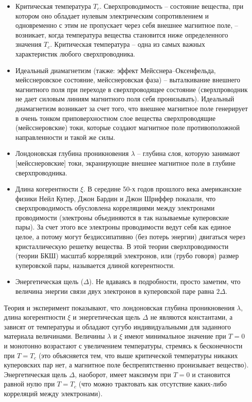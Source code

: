 \begin{itemize}
    \item Критическая температура \( T_c \). Сверхпроводимость -- состояние 
        вещества, при котором оно обладает нулевым электрическим 
        сопротивлением и одновременно с этим не пропускает через себя внешнее 
        магнитное поле, -- возникает, когда температура вещества становится 
        ниже определенного значения \( T_c \). Критическая температура -- одна 
        из самых важных характеристик любого сверхпроводника.
    \item Идеальный диамагнетизм (также: эффект Мейсснера–Оксенфельда, 
        мейсснеровское состояние, мейсснеровская фаза) -- выталкивание 
        внешнего магнитного поля при переходе в сверхпроводящее состояние 
        (сверхпроводник не дает силовым линиям магнитного поля себя 
        пронизывать). Идеальный диамагнетизм возникает за счет того, что 
        внешнее магнитное поле генерирует в очень тонком приповерхностном 
        слое вещества сверхпроводящие (мейсснеровские) токи, которые создают 
        магнитное поле противоположной направленности и такой же силы.
    \item Лондоновская глубина проникновения \( \lambda \) -- глубина слоя, 
        которую занимают [мейсснеровские] токи, экранирующие внешнее магнитное 
        поле в глубине сверхпроводника.
    \item Длина когерентности \( \xi \). В середине 50-х годов прошлого века 
        американские физики Нейл Купер, Джон Бардин и Джон Шриффер показали, 
        что сверхпроводимость обусловлена корреляциями между электронами 
        проводимости (электроны объединяются в так называемые куперовские 
        пары). За счет этого все электроны проводимости ведут себя как единое 
        целое, а потому могут бездиссипативно (без потерь энергии) двигаться 
        через кристаллическую решетку вещества. В этой теории 
        сверхпроводимости (теории БКШ) масштаб корреляций электронов, или 
        (грубо говоря) размер куперовской пары, называется длиной 
        когерентности.
    \item Энергетическая щель (\( \Delta \)). Не вдаваясь в подробности, 
        просто заметим, что величина энергии связи двух электронов в 
        куперовской паре равна \( 2\Delta \).
\end{itemize}

Теория и эксперимент показывают, что лондоновская глубина проникновения 
\( \lambda \), длина когерентности \( \xi \) и энергетическая щель 
\( \Delta \) не являются константами, а зависят от температуры и обладают 
сугубо индивидуальными для заданного материала величинами. Величины 
\( \lambda \) и \( \xi \) имеют минимальное значение при \( T = 0 \) и 
монотонно возрастают с увеличением температуры, стремясь к бесконечности при 
\( T = T_c \) (это объясняется тем, что выше критической температуры никаких 
куперовских пар нет, а магнитное поле беспрепятственно пронизывает вещество). 
Энергетическая щель \( \Delta \), наоборот, имеет максимум при \( T = 0 \) и 
становится равной нулю при \( T = T_c \) (что можно трактовать как отсутствие 
каких-либо корреляций между электронами).

